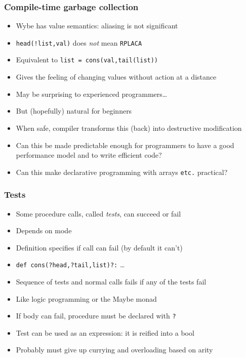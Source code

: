 \documentclass[12pt]{beamer}
\begin{document}
\begin{frame}
\frametitle{Compile-time garbage collection}
\begin{itemize}
\item Wybe has value semantics:  aliasing is not significant
\item \texttt{head(!list,val)} does \emph{not} mean \texttt{RPLACA}
\item Equivalent to \texttt{list = cons(val,tail(list))}
\item Gives the feeling of changing values without action at a distance
\item May be surprising to experienced programmers\ldots
\item But (hopefully) natural for beginners
\item When safe, compiler transforms this (back) into destructive
  modification
\item Can this be made predictable enough for programmers
  to have a good performance model and to write efficient code?
\item Can this make declarative programming with arrays \texttt{etc.} practical?
\end{itemize}
\end{frame}


\begin{frame}
\frametitle{Tests}
\begin{itemize}
\item Some procedure calls, called \emph{tests}, can succeed or fail
\item Depends on mode
\item Definition specifies if call can fail (by default it can't)
\item \texttt{def cons(?head,?tail,list)?:} \ldots
\item Sequence of tests and normal calls fails if any of the tests fail
\item Like logic programming or the Maybe monad
\item If body can fail, procedure must be declared with \texttt{?}
\item Test can be used as an expression:  it is reified into a bool
\item Probably must give up currying and overloading based on arity
\end{itemize}
\end{frame}
\end{document}
